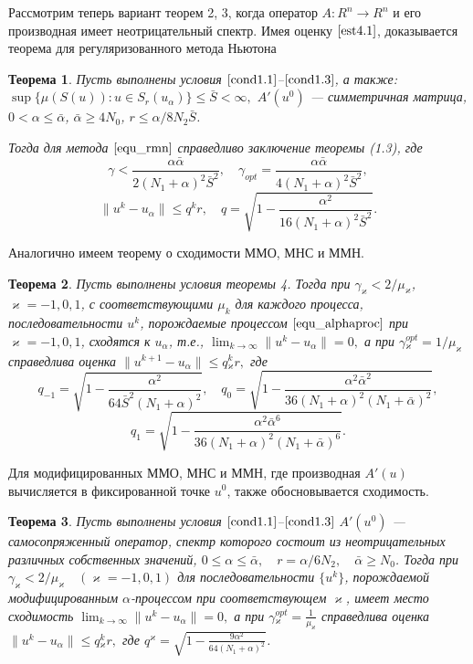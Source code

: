 \documentclass[%
autoref,     %
href,        %
facsimile,   %
colorlinks,  %
]{disser}
\newtheorem{theorem}{Теорема}
\begin{document}
Рассмотрим теперь вариант теорем 2, 3, когда оператор $A\colon R^n \to R^n$ и его производная имеет неотрицательный спектр. Имея оценку $\eqref{est4.1}$, доказывается теорема для регуляризованного метода Ньютона
\begin{theorem}\label{conv_rate_nemonot_nwt}
	Пусть выполнены условия $\eqref{cond1.1}$--$\eqref{cond1.3}$, а также: $\sup\{\mu(S(u)): u\in S_r(u_\alpha)\}\leqslant\bar S <\infty,$ 
	$A'(u^0)$ --- симметричная матрица, $0<\alpha\leqslant\bar\alpha$, $\bar\alpha\geqslant 4N_0$, $r\leqslant\alpha/8N_2\bar S$.

	Тогда для метода $\eqref{equ_rmn}$ справедливо заключение теоремы (1.3), где
	$$\gamma<\frac{\alpha\bar\alpha}{2(N_1+\alpha)^2\bar S^2},
	\quad
	{\gamma}_{opt}=\frac{\alpha\bar\alpha}{4(N_1+\alpha)^2\bar S^2},$$ 
	$$\|u^k-u_\alpha\|\leqslant q^k r, \quad q=\sqrt{1-\frac{\alpha ^2}{16(N_1+\alpha)^2\bar S^2}}.$$
\end{theorem}
Аналогично имеем теорему о сходимости ММО, МНС и ММН.
\begin{theorem}\label{conv_rate_nemonot_alpha}
Пусть выполнены условия теоремы 4. 
Тогда при $\gamma_\varkappa<2/\mu _\varkappa$, $\varkappa=-1,0,1$, с соответствующими $\mu _k$ для каждого процесса, последовательности ${u^k}$, порождаемые процессом $\eqref{equ_alphaproc}$ при $\varkappa=-1,0,1$, сходятся к $u_\alpha$, т.е., $\lim_{k\to\infty}\|u^k-u_\alpha\|=0,$ а при $
\gamma{_\varkappa^{opt}}=1/\mu_\varkappa$
справедлива оценка $\|u^{k+1}-u_\alpha\|\leqslant q{_\varkappa^k}r,$ где
$$q_{-1}=\sqrt{1-\frac{\alpha^2}{64\bar S^2(N_1+\alpha)^2}}, \quad q_0=\sqrt{1-\frac{\alpha^2\bar\alpha^2}{36(N_1+\alpha)^2(N_1+\bar\alpha)^2}},$$
$$q_1=\sqrt{1-\frac{\alpha^2\bar\alpha^6}{36(N_1+\alpha)^2(N_1+\bar\alpha)^6}}.$$
\end{theorem}
Для модифицированных ММО, МНС и ММН, где производная $A'(u)$ вычисляется в фиксированной точке $u^0$, также обосновывается сходимость.	
\begin{theorem}\label{conv_rate_nemonot_alpha_mod}
	Пусть выполнены условия $\eqref{cond1.1}$--$\eqref{cond1.3}$ $A'(u^0)$ --- самосопряженный оператор, спектр которого состоит из неотрицательных различных собственных значений, 
	$0\leqslant\alpha\leqslant\bar{\alpha}, \quad r=\alpha/6N_2, \quad \bar{\alpha}\geqslant N_0$. Тогда при
	$\gamma _\varkappa <2/\mu _\varkappa \quad (\varkappa=-1,0,1)$
	для последовательности $\{u^k\}$, порождаемой модифицированным $\alpha$-процессом при соответствующем $\varkappa$, имеет место сходимость $\lim_{k\to\infty}\|u^k-u_\alpha\|=0, $ а при 
	$\gamma{_\varkappa^{opt}}=\frac{1}{\mu_\varkappa}$
	справедлива оценка $\|u^k-u_\alpha\|\leqslant q{_\varkappa^k}r,$ где
	$q^\varkappa=\sqrt{1-\frac{9\alpha^2}{64(N_1+\alpha)^2}}$.
\end{theorem}
\end{document}
